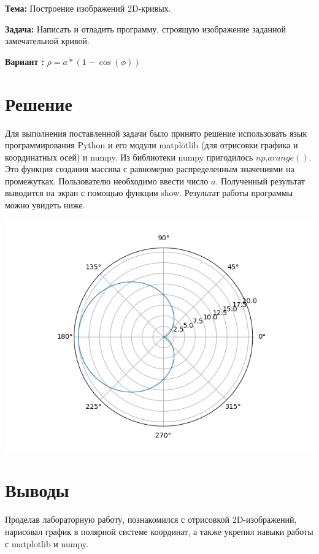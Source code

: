 \documentclass[12pt, a4paper]{article}
\begin{document}
    \par\textbf{Тема: } {
        Построение изображений 2D-кривых.
    }

    \par\textbf{Задача: } {
        Написать и отладить программу, строящую изображение заданной 
        замечательной кривой.
    }

    \par\textbf{Вариант : }
    $\rho= a * (1 - \cos(\phi))$
    
    \section{Решение}
    Для выполнения поставленной задачи было принято решение использовать язык 
    программирования Python и его модули matplotlib (для отрисовки графика и 
    координатных осей) и numpy. Из библиотеки numpy пригодилось $np.arange()$.
    Это функция создания массива с равномерно распределенным значениями на промежутках.
    Пользователю необходимо ввести число $a$. Полученный результат выводится на экран с 
    помощью функции show. Результат работы программы можно увидеть ниже.
    
    \includegraphics[scale=0.75]{Figure_1.png}
    
    \pagebreak
    
    \section{Выводы}
    Проделав лабораторную работу, познакомился с отрисовкой 2D-изображений, 
    нарисовал график в полярной системе координат, а также укрепил навыки 
    работы с matplotlib и numpy.
\end{document}
